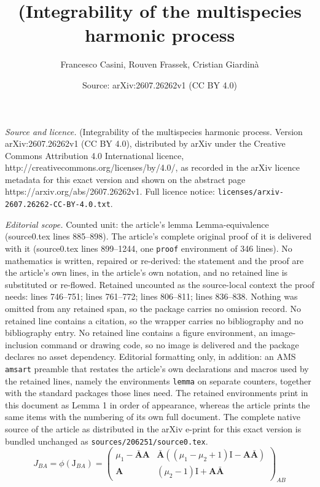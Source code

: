 \documentclass[10pt,a4paper]{amsart}
\title{(Integrability of the multispecies harmonic process}
\author{Francesco Casini, Rouven Frassek, Cristian Giardinà}
\date{Source: arXiv:2607.26262v1 (CC BY 4.0)}
\newcommand{\ID}{\mathrm{I}}
\newcommand{\OA}{\mathbf{A}}
\newcommand{\OAD}{\mathbf{\bar{A}}}
\newcommand{\mmu}{\mu}
\begin{document}
\maketitle

\noindent\emph{Source and licence.} (Integrability of the multispecies harmonic process. Version arXiv:2607.26262v1 (CC BY 4.0), distributed by arXiv under the Creative Commons Attribution 4.0 International licence, http://creativecommons.org/licenses/by/4.0/, as recorded in the arXiv licence metadata for this exact version and shown on the abstract page https://arxiv.org/abs/2607.26262v1. Full licence notice: \texttt{licenses/arxiv-2607.26262-CC-BY-4.0.txt}.\par\smallskip

\noindent\textit{Editorial scope.} Counted unit: the article's lemma Lemma-equivalence (source0.tex lines 885--898). The article's complete original proof of it is delivered with it (source0.tex lines 899--1244, one \texttt{proof} environment of 346 lines). No mathematics is written, repaired or re-derived: the statement and the proof are the article's own lines, in the article's own notation, and no retained line is substituted or re-flowed.  Retained uncounted as the source-local context the proof needs: lines 746--751; lines 761--772; lines 806--811; lines 836--838.  Nothing was omitted from any retained span, so the package carries no omission record.  No retained line contains a citation, so the wrapper carries no bibliography and no bibliography entry.  No retained line contains a figure environment, an image-inclusion command or drawing code, so no image is delivered and the package declares no asset dependency.  Editorial formatting only, in addition: an AMS \texttt{amsart} preamble that restates the article's own declarations and macros used by the retained lines, namely the environments \texttt{lemma} on separate counters, together with the standard packages those lines need.  The retained environments print in this document as Lemma 1 in order of appearance, whereas the article prints the same items with the numbering of its own full document.  The complete native source of the article as distributed in the arXiv e-print for this exact version is bundled unchanged as \texttt{sources/206251/source0.tex}.
	\begin{equation}\label{GL-oscRealization}
		J_{BA}=\phi(\mathrm{J}_{BA})=\left(\begin{array}{cc}
			\mmu_1-\OAD\OA&\OAD\left((\mmu_1-\mmu_2+1)\ID-\OA\OAD\right)\\
			\OA&(\mmu_2-1)\ID+\OA\OAD
		\end{array}\right) _{AB}
	\end{equation}
\end{document}
